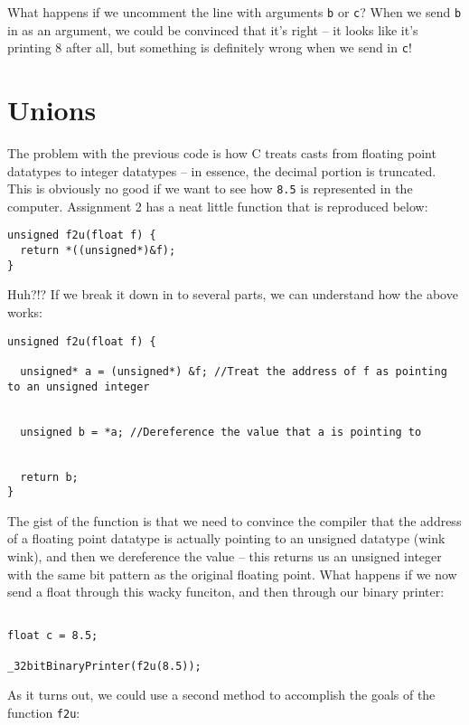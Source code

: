 \documentclass[10pt]{article}
\begin{document}
\noindent What happens if we uncomment the line with arguments \texttt{b} or \texttt{c}? When we send \texttt{b} in as an argument, we could be convinced that it's right -- it looks like it's printing 8 after all, but something is definitely wrong when we send in \texttt{c}!



\section*{Unions}

The problem with the previous code is how C treats casts from floating point datatypes to integer datatypes -- in essence, the decimal portion is truncated. This is obviously no good if we want to see how \texttt{8.5} is represented in the computer. Assignment 2 has a neat little function that is reproduced below:


\begin{lstlisting}
unsigned f2u(float f) {
  return *((unsigned*)&f);
}
\end{lstlisting}


Huh?!? If we break it down in to several parts, we can understand how the above works:

\begin{lstlisting}
unsigned f2u(float f) {

  unsigned* a = (unsigned*) &f; //Treat the address of f as pointing to an unsigned integer


  unsigned b = *a; //Dereference the value that a is pointing to


  return b;
}
\end{lstlisting}

The gist of the function is that we need to convince the compiler that the address of a floating point datatype is actually pointing to an unsigned datatype (wink wink), and then we dereference the value -- this returns us an unsigned integer with the same bit pattern as the original floating point. What happens if we now send a float through this wacky funciton, and then through our binary printer:


\begin{lstlisting}

float c = 8.5;

_32bitBinaryPrinter(f2u(8.5));
\end{lstlisting}

\newpage

As it turns out, we could use a second method to accomplish the goals of the function \texttt{f2u}:
\end{document}
